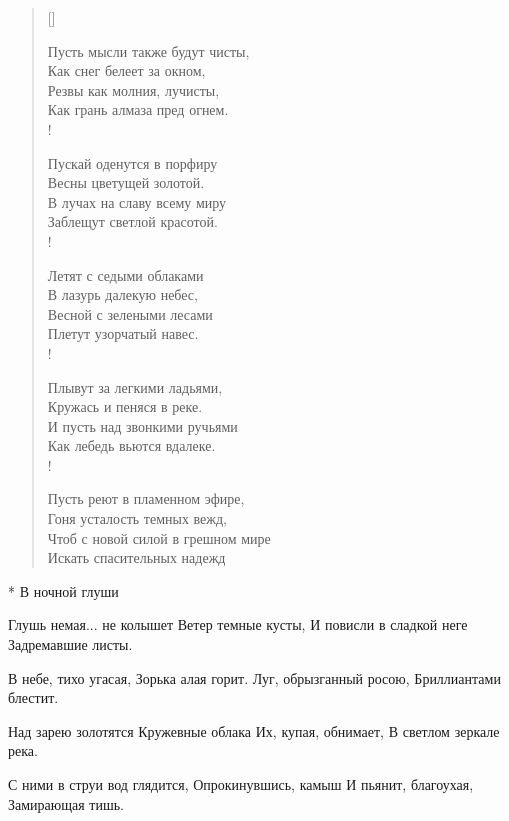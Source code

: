 \newpage
\vspace*{0cm}


\settowidth{\versewidth}{Пусть мысли также будут чисты,}
\begin{verse}[\versewidth]
\begin{altverse}
Пусть мысли также будут чисты,\\
          Как снег белеет за окном,\\
Резвы как молния, лучисты,\\
          Как грань алмаза пред огнем.\\!

Пускай оденутся в порфиру\\
          Весны цветущей золотой.\\
В лучах на славу всему миру\\
          Заблещут светлой красотой.\\!

Летят с седыми облаками\\
          В лазурь далекую небес,\\
Весной с зелеными лесами\\
          Плетут узорчатый навес.\\!

Плывут за легкими ладьями,\\
          Кружась и пеняся в реке.\\
И пусть над звонкими ручьями\\
          Как лебедь вьются вдалеке.\\!

Пусть реют в пламенном эфире,\\
          Гоня усталость темных вежд,\\
Чтоб с новой силой в грешном мире\\
Искать спасительных надежд\ldotst
\end{altverse}
\end{verse}
﻿* В ночной глуши

Глушь немая... не колышет
Ветер темные кусты,
И повисли в сладкой неге
Задремавшие листы.

В небе, тихо угасая,
Зорька алая горит.
Луг, обрызганный росою,
Бриллиантами блестит.

Над зарею золотятся
Кружевные облака
Их, купая, обнимает,
В светлом зеркале река.

С ними в струи вод глядится,
Опрокинувшись, камыш
И пьянит, благоухая,
Замирающая тишь.

